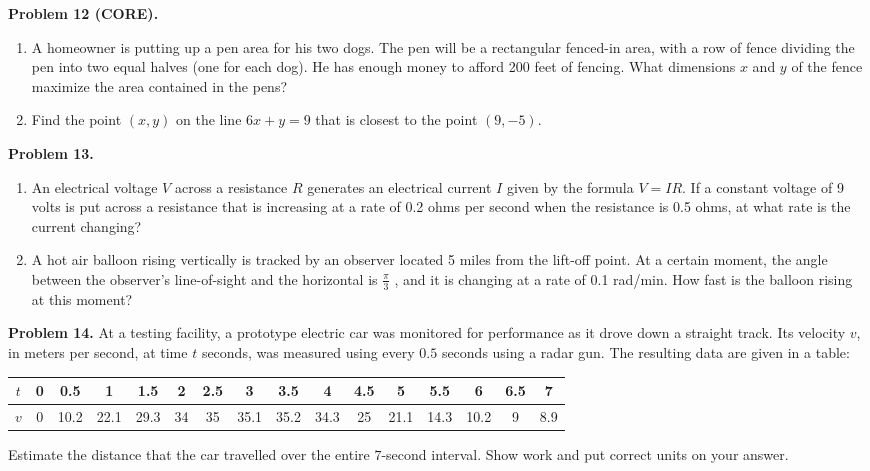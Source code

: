 \documentclass[addpoints]{exam}
\begin{document}
\vspace{0.3in}

\noindent
\textbf{Problem 12 (CORE).} 
	\begin{enumerate}
		\item A homeowner is putting up a pen area for his two dogs. The pen will be a rectangular fenced-in area, with a row of fence dividing the pen into two equal halves (one for each dog). He has enough money to afford 200 feet of fencing. What dimensions $x$ and $y$ of the fence maximize the area contained in the pens? 
		\item Find the point $(x,y)$ on the line $6x + y = 9$ that is closest to the point $(9, -5)$.  
	\end{enumerate}


\vspace{0.3in}

\noindent
\textbf{Problem 13.} 
	\begin{enumerate}
		\item An electrical voltage $V$ across a resistance $R$ generates an electrical current $I$ given by the formula $V = IR$.	If a constant voltage of 9 volts is put across a resistance that is increasing at a rate of 0.2 ohms per second when the resistance is 0.5 ohms, at what rate is the current changing?
		\item A hot air balloon rising vertically is tracked by an observer located 5 miles from the lift-off point. At a certain moment, the angle between the observer's line-of-sight and the horizontal is $\frac{\pi}{3}$ , and it is changing at a rate of 0.1 rad/min. How fast is the balloon rising at this moment?
	\end{enumerate}


\vspace{0.3in}

\noindent
\textbf{Problem 14.} At a testing facility, a prototype electric car was monitored for performance as it drove down a straight track. Its velocity $v$, in meters per second, at time $t$ seconds, was measured using every $0.5$ seconds using a radar gun. The resulting data are given in a table:
\begin{center}
	\begin{tabular}{c||ccccccccccccccc}
		$t$ & 0 & 0.5  & 1 & 1.5 & 2 & 2.5 & 3 & 3.5 & 4 & 4.5 & 5 & 5.5 & 6 & 6.5 & 7 \\ \hline
		$v$ & 0 & 10.2 & 22.1 & 29.3 & 34 & 35 & 35.1 & 35.2 & 34.3  & 25 & 21.1 &14.3 & 10.2 & 9 & 8.9
		\end{tabular} 		
\end{center} 
Estimate the distance that the car travelled over the entire $7$-second interval. Show work and put correct units on your answer.
\end{document}
